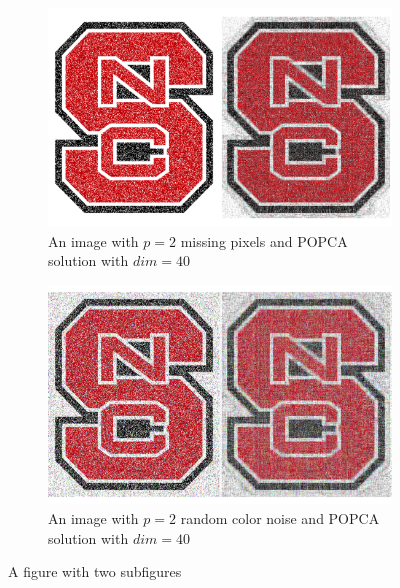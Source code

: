 \documentclass[12pt]{article}
\begin{document}
	\begin{figure}[h]
		\centering
		
		\begin{subfigure}{.45\textwidth}
			\centering
			\includegraphics[width=\linewidth]{Missing}
			\caption{An image with $p = 2$ missing pixels and POPCA solution with $dim = 40$}
			\label{fig:missing}
		\end{subfigure}%
		\hfill
		\begin{subfigure}{.45\textwidth}
			\centering
			\includegraphics[width=\linewidth]{Color}
			\caption{An image with $p = 2$ random color noise and POPCA solution with $dim = 40$}
			\label{fig:color}
		\end{subfigure}
		
		\caption{A figure with two subfigures}
		\label{fig:badge}
	\end{figure}
	
\end{document}
